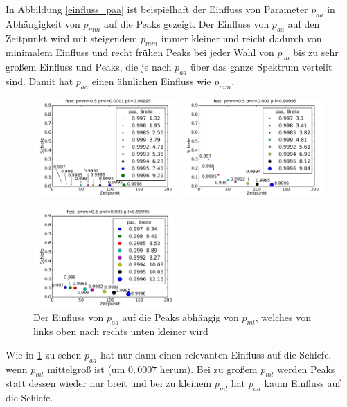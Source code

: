 In Abbildung \ref{einfluss_paa} ist beispielhaft der Einfluss von Parameter $p_{aa}$ in Abhängigkeit von $p_{mm}$ auf die Peaks gezeigt. Der Einfluss von $p_{aa}$ auf den Zeitpunkt wird mit steigendem $p_{mm}$ immer kleiner und reicht dadurch von minimalem Einfluss und recht frühen Peaks bei jeder Wahl von $p_{aa}$ bis zu sehr großem Einfluss und Peaks, die je nach $p_{aa}$ über das ganze Spektrum verteilt sind. Damit hat $p_{aa}$ einen ähnlichen Einfluss wie $p_{mm}$.

\begin{figure}[h]
\includegraphics[width=0.49\textwidth]{bilder/paa/3fest_05_00001_p_099995}
\includegraphics[width=0.49\textwidth]{bilder/paa/3fest_05_0001_p_099995}

\includegraphics[width=0.49\textwidth]{bilder/paa/3fest_05_0005_p_099995}
\caption[Der Einfluss von $p_{aa}$ auf die Peaks abhängig von $p_{ml}$]{Der Einfluss von $p_{aa}$ auf die Peaks abhängig von $p_{ml}$, welches von links oben nach rechts unten kleiner wird}
\label{einfluss_paa_pml}
\end{figure}

Wie in \ref{einfluss_paa_pml} zu sehen $p_{aa}$ hat nur dann einen relevanten Einfluss auf die Schiefe, wenn $p_{ml}$ mittelgroß ist (um $0,0007$ herum). Bei zu großem $p_{ml}$ werden Peaks statt dessen wieder nur breit und bei zu kleinem $p_{ml}$ hat $p_{aa}$ kaum Einfluss auf die Schiefe. 

